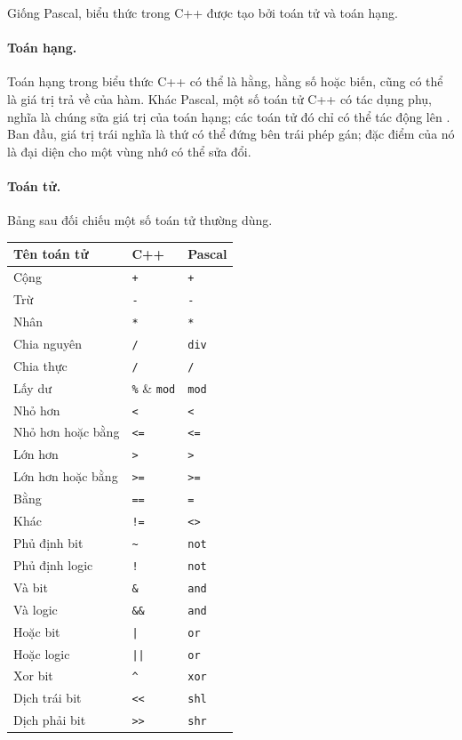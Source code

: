 \documentclass[11pt]{article}
\newcommand{\cpp}{C++}
\newcommand{\pascal}{Pascal}
\begin{document}
Giống \pascal{}, biểu thức trong \cpp{} được tạo bởi toán tử và toán hạng.

\paragraph{Toán hạng.}
Toán hạng trong biểu thức \cpp{} có thể là hằng, hằng số hoặc biến, cũng có
thể là giá trị trả về của hàm. Khác \pascal{}, một số toán tử \cpp{} có tác
dụng phụ, nghĩa là chúng sửa giá trị của toán hạng; các toán tử đó chỉ có thể
tác động lên . Ban đầu, giá trị trái nghĩa là thứ có thể
đứng bên trái phép gán; đặc điểm của nó là đại diện cho một vùng nhớ có thể
sửa đổi.

\paragraph{Toán tử.}
Bảng sau đối chiếu một số toán tử thường dùng.

\begin{center}
\begin{tabular}{lll}
\hline
\textbf{Tên toán tử} & \textbf{\cpp{}} & \textbf{\pascal{}}\\
\hline
Cộng & \verb|+| & \verb|+|\\
Trừ & \verb|-| & \verb|-|\\
Nhân & \verb|*| & \verb|*|\\
Chia nguyên & \verb|/| & \verb|div|\\
Chia thực & \verb|/| & \verb|/|\\
Lấy dư & \verb|%| & \verb|mod|\\
Nhỏ hơn & \verb|<| & \verb|<|\\
Nhỏ hơn hoặc bằng & \verb|<=| & \verb|<=|\\
Lớn hơn & \verb|>| & \verb|>|\\
Lớn hơn hoặc bằng & \verb|>=| & \verb|>=|\\
Bằng & \verb|==| & \verb|=|\\
Khác & \verb|!=| & \verb|<>|\\
Phủ định bit & \verb|~| & \verb|not|\\
Phủ định logic & \verb|!| & \verb|not|\\
Và bit & \verb|&| & \verb|and|\\
Và logic & \verb|&&| & \verb|and|\\
Hoặc bit & \verb"|" & \verb|or|\\
Hoặc logic & \verb"||" & \verb|or|\\
Xor bit & \verb|^| & \verb|xor|\\
Dịch trái bit & \verb|<<| & \verb|shl|\\
Dịch phải bit & \verb|>>| & \verb|shr|\\
\hline
\end{tabular}
\end{center}
\end{document}
